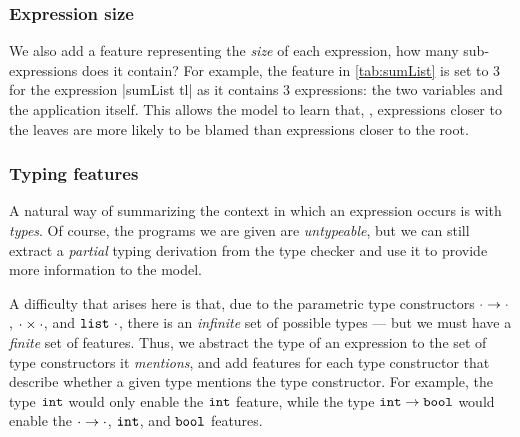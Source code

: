 
\subsubsection{Expression size}
We also add a feature representing the \emph{size} of each expression,
\ie how many sub-expressions does it contain?
%
For example, the \ExprSize feature in \autoref{tab:sumList} is set to 3
for the expression |sumList tl| as it contains 3 expressions:
the two variables and the application itself.
%
This allows the model to learn that, \eg, expressions closer to the
leaves are more likely to be blamed than expressions closer to the root.

\subsubsection{Typing features}
A natural way of summarizing the context in which an expression occurs
is with \emph{types}.
%
Of course, the programs we are given are \emph{untypeable}, but we can
still extract a \emph{partial} typing derivation from the type checker
and use it to provide more information to the model.

A difficulty that arises here is that, due to the parametric type
constructors $\cdot \to \cdot$, $\cdot \times \cdot$, and
$\mathtt{list}\ \cdot$, there is an \emph{infinite} set of possible types ---
but we must have a \emph{finite} set of features.
%
Thus, we abstract the type of an expression to the set of type
constructors it \emph{mentions}, and add features for each type
constructor that describe whether a given type mentions the type
constructor.
%
For example, the type $\mathtt{int}$ would only enable the $\mathtt{int}$ feature,
while the type $\mathtt{int} \to \mathtt{bool}$ would enable the
$\cdot \to \cdot$, $\mathtt{int}$, and $\mathtt{bool}$ features.

